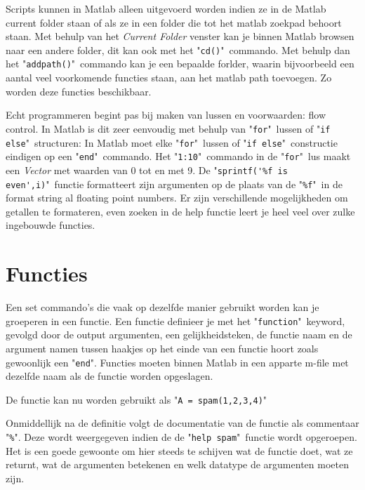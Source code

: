 \documentclass[11pt,twoside]{article}
\begin{document}
Scripts kunnen in Matlab alleen uitgevoerd worden indien ze in de Matlab current folder staan of als ze in een folder die tot het matlab zoekpad behoort staan. Met behulp van het \emph{Current Folder} venster kan je binnen Matlab browsen naar een andere folder, dit kan ook met het "\lstinline{cd()}"\ commando. Met behulp dan het "\lstinline{addpath()}"\ commando kan je een bepaalde forlder, waarin bijvoorbeeld een aantal veel voorkomende functies staan, aan het matlab path toevoegen. Zo worden deze functies beschikbaar.

Echt programmeren begint pas bij maken van lussen en voorwaarden: flow control. In Matlab is dit zeer eenvoudig met behulp van "\lstinline{for}"\ lussen of "\lstinline{if else}"\ structuren:
 In Matlab moet elke "\lstinline{for}"\ lussen of "\lstinline{if else}"\ constructie eindigen op een "\lstinline{end}"\ commando.
Het "\lstinline{1:10}"\ commando in de "\lstinline{for}"\ lus maakt een \emph{Vector} met waarden van 0 tot en met 9. De "\lstinline{sprintf('%f is even',i)}"\ functie formatteert zijn argumenten op de plaats van de "\lstinline{%f}"\ in de format string al floating point numbers. Er zijn verschillende mogelijkheden om getallen te formateren, even zoeken in de help functie leert je heel veel over zulke ingebouwde functies.

	\section{Functies}
Een set commando's die vaak op dezelfde manier gebruikt worden kan je groeperen in een functie. Een functie definieer je met het "\lstinline{function}"\ keyword, gevolgd door de output argumenten, een gelijkheidsteken, de functie naam en de argument namen tussen haakjes op het einde van een functie hoort zoals gewoonlijk een "\lstinline{end}". Functies moeten binnen Matlab in een apparte m-file met dezelfde naam als de functie worden opgeslagen.


De functie kan nu worden gebruikt als "\lstinline{A = spam(1,2,3,4)}"\

Onmiddellijk na de definitie volgt de documentatie van de functie als commentaar "\lstinline{%}". Deze wordt weergegeven indien de de "\lstinline{help spam}"\ functie wordt opgeroepen. Het is een goede gewoonte om hier steeds te schijven wat de functie doet, wat ze returnt, wat de argumenten betekenen en welk datatype de argumenten moeten zijn.
\end{document}
